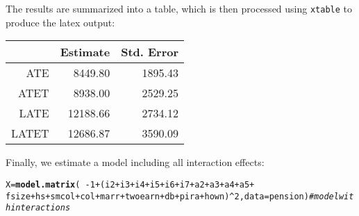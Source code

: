 \documentclass{amsart}\usepackage[]{graphicx}\usepackage[]{color}
\makeatletter
\newcommand{\hlnum}[1]{\textcolor[rgb]{0.686,0.059,0.569}{#1}}%
\newcommand{\hlcom}[1]{\textcolor[rgb]{0.678,0.584,0.686}{\textit{#1}}}%
\newcommand{\hlopt}[1]{\textcolor[rgb]{0,0,0}{#1}}%
\newcommand{\hlstd}[1]{\textcolor[rgb]{0.345,0.345,0.345}{#1}}%
\newcommand{\hlkwb}[1]{\textcolor[rgb]{0.69,0.353,0.396}{#1}}%
\newcommand{\hlkwc}[1]{\textcolor[rgb]{0.333,0.667,0.333}{#1}}%
\newcommand{\hlkwd}[1]{\textcolor[rgb]{0.737,0.353,0.396}{\textbf{#1}}}%
\newenvironment{kframe}{%
 \def\at@end@of@kframe{}%
 \ifinner\ifhmode%
  \def\at@end@of@kframe{\end{minipage}}%
  \begin{minipage}{\columnwidth}%
 \fi\fi%
 \def\FrameCommand##1{\hskip\@totalleftmargin \hskip-\fboxsep
 \colorbox{shadecolor}{##1}\hskip-\fboxsep
     \hskip-\linewidth \hskip-\@totalleftmargin \hskip\columnwidth}%
 \MakeFramed {\advance\hsize-\width
   \@totalleftmargin\z@ \linewidth\hsize
   \@setminipage}}%
 {\par\unskip\endMakeFramed%
 \at@end@of@kframe}
\newenvironment{knitrout}{}{} %
\newcommand{\code}[1]{\texttt{#1}}
\makeatother
\begin{document}
The results are summarized into a table, which is then
processed using \code{xtable} to produce the latex output:



\begin{table}[ht]
\centering
\begin{tabular}{rrr}
  \hline
 & Estimate & Std. Error \\ 
  \hline
ATE & 8449.80 & 1895.43 \\ 
  ATET  & 8938.00 & 2529.25 \\ 
  LATE & 12188.66 & 2734.12 \\ 
  LATET & 12686.87 & 3590.09 \\ 
   \hline
\end{tabular}
\end{table}


Finally, we estimate a model including all interaction effects:

\begin{knitrout}
\color{fgcolor}\begin{kframe}
\begin{alltt}
\hlstd{X} \hlkwb{=} \hlkwd{model.matrix}\hlstd{(}\hlopt{~ -}\hlnum{1} \hlopt{+} \hlstd{(i2} \hlopt{+} \hlstd{i3} \hlopt{+} \hlstd{i4} \hlopt{+} \hlstd{i5} \hlopt{+} \hlstd{i6} \hlopt{+} \hlstd{i7} \hlopt{+} \hlstd{a2} \hlopt{+} \hlstd{a3} \hlopt{+} \hlstd{a4} \hlopt{+} \hlstd{a5} \hlopt{+}
                  \hlstd{fsize} \hlopt{+} \hlstd{hs} \hlopt{+} \hlstd{smcol} \hlopt{+} \hlstd{col} \hlopt{+} \hlstd{marr} \hlopt{+} \hlstd{twoearn} \hlopt{+} \hlstd{db} \hlopt{+} \hlstd{pira} \hlopt{+} \hlstd{hown)}\hlopt{^}\hlnum{2}\hlstd{,} \hlkwc{data} \hlstd{= pension)} \hlcom{# model with interactions}
\end{alltt}
\end{kframe}
\end{knitrout}
\end{document}
